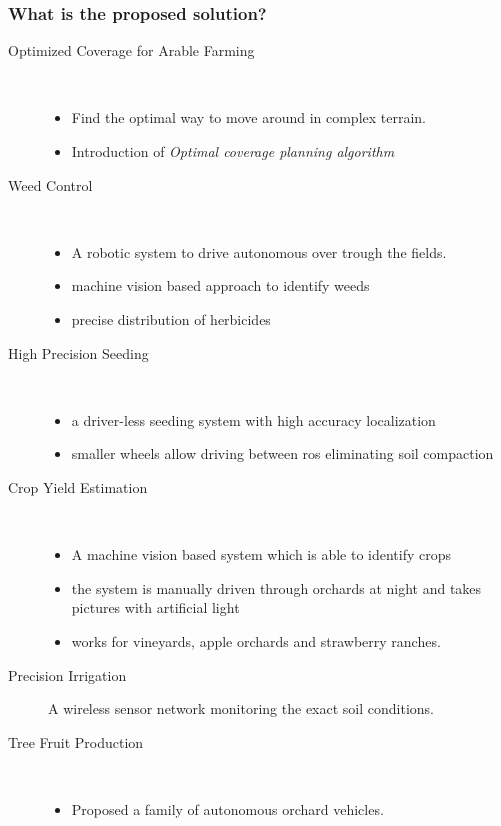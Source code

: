 \subsubsection*{What is the proposed solution?}
\begin{description}

    \item[Optimized Coverage for Arable Farming] \
    \begin{itemize}
        \item Find the optimal way to move around in complex terrain.
        \item Introduction of \emph{Optimal coverage planning algorithm}
    \end{itemize}
    \item[Weed Control]\
    \begin{itemize}
        \item A robotic system to drive autonomous over trough the fields.
        \item machine vision based approach to identify weeds
        \item precise distribution of herbicides
    \end{itemize}
    \item[High Precision Seeding]\
    \begin{itemize}
        \item a driver-less seeding system with high accuracy localization
        \item smaller wheels allow driving between ros eliminating soil compaction 
    \end{itemize}
    \item[Crop Yield Estimation]\
    \begin{itemize}
        \item A machine vision based system which is able to identify crops
        \item the system is manually driven through orchards at night and takes pictures with artificial light
        \item works for vineyards, apple orchards and strawberry ranches.
    \end{itemize} 
    \item[Precision Irrigation] A wireless sensor network monitoring the exact soil conditions.
    \item[Tree Fruit Production] \
    \begin{itemize}
        \item Proposed a family of autonomous orchard vehicles. 

\end{itemize}
\end{description}
